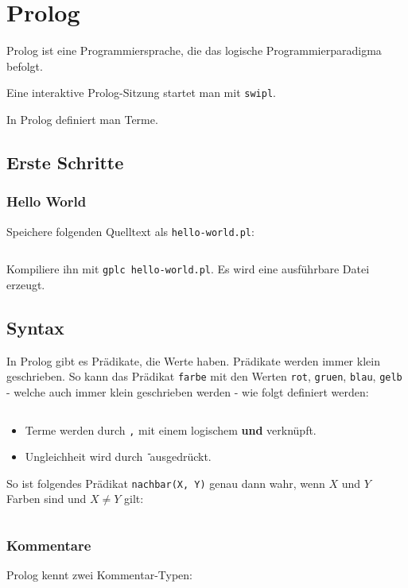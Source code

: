 \chapter{Prolog}

Prolog ist eine Programmiersprache, die das logische Programmierparadigma
befolgt.

Eine interaktive Prolog-Sitzung startet man mit \texttt{swipl}.

In Prolog definiert man Terme.
\section{Erste Schritte}
\subsection{Hello World}
Speichere folgenden Quelltext als \texttt{hello-world.pl}:
\inputminted[linenos, numbersep=5pt, tabsize=4, frame=lines, label=hello-world.hs]{prolog}{scripts/prolog/hello-world.pl}

Kompiliere ihn mit \texttt{gplc hello-world.pl}. Es wird eine
ausführbare Datei erzeugt.

\section{Syntax}
In Prolog gibt es Prädikate, die Werte haben. Prädikate werden immer klein geschrieben.
So kann das Prädikat \texttt{farbe} mit den Werten \texttt{rot}, \texttt{gruen},
\texttt{blau}, \texttt{gelb} - welche auch immer klein geschrieben werden - wie 
folgt definiert werden:

\inputminted[numbersep=5pt, tabsize=4]{prolog}{scripts/prolog/praedikat-farbe.pl}

\begin{itemize}
    \item Terme werden durch \texttt{,} mit einem logischem \textbf{und} verknüpft.
    \item Ungleichheit wird durch \texttt{\=} ausgedrückt.
\end{itemize}

So ist folgendes Prädikat \texttt{nachbar(X, Y)} genau dann wahr, wenn $X$
und $Y$ Farben sind und $X \neq Y$ gilt:

\inputminted[numbersep=5pt, tabsize=4]{prolog}{scripts/prolog/simple-term.pl}

\subsection{Kommentare}
Prolog kennt zwei Kommentar-Typen:

